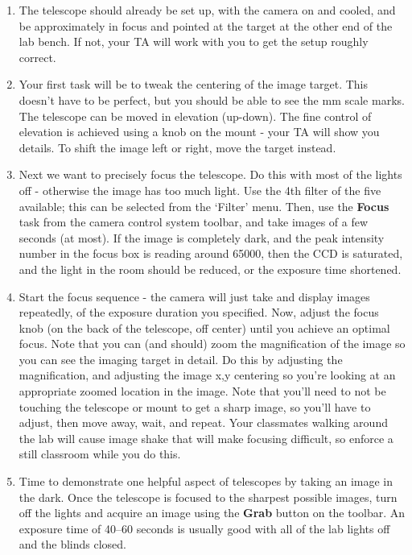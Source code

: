 \begin{enumerate}
	\item The telescope should already be set up, with the camera on and cooled, and be approximately
	in focus and pointed at the target at the other end of the lab bench. If not, your TA will
	work with you to get the setup roughly correct.
	
	\item Your first task will be to tweak the centering of the image target. This doesn’t have to be
	perfect, but you should be able to see the mm scale marks. The telescope can be moved in elevation (up-down). The fine control of elevation is achieved using a knob on the mount - your TA will show you details. To shift the image left or right, move the target instead.
	
	\item Next we want to precisely focus the telescope. Do this with most of the lights off - otherwise
	the image has too much light. Use the 4th filter of the five available; this can be selected
	from the ‘Filter’ menu. Then, use the \textbf{Focus} task from the camera control system toolbar,
	and take images of a few seconds (at most). If the image is completely dark, and the peak intensity number in the focus box is reading around 65000, then the CCD is saturated, and the light in the room should be reduced, or the exposure time shortened.
	
	\item Start the focus sequence - the camera will just
	take and display images repeatedly, of the exposure duration you specified. Now, adjust
	the focus knob (on the back of the telescope, off center) until you achieve an optimal focus.
	Note that you can (and should) zoom the magnification of the image so you can see the
	imaging target in detail. Do this by adjusting the magnification, and adjusting the image
	x,y centering so you’re looking at an appropriate zoomed location in the image. Note that
	you’ll need to not be touching the telescope or mount to get a sharp image, so you’ll
	have to adjust, then move away, wait, and repeat. Your classmates walking around the lab
	will cause image shake that will make focusing difficult, so enforce a still classroom while
	you do this.
	
	\item Time to demonstrate one helpful aspect of telescopes by taking an image in the dark. Once the telescope is focused to the sharpest possible images, turn off the lights and acquire an image using the
	\textbf{Grab} button on the toolbar. An exposure time of 40--60 seconds is usually good with all of
	the lab lights off and the blinds closed.
	

\end{enumerate}
